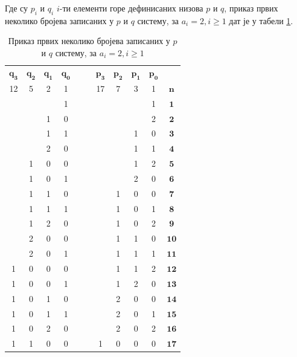 \documentclass[a4paper]{article}
\begin{document}
Где су $ p_{i} $ и $ q_{i} $ $ i $-ти елементи горе дефинисаних низова $ p $ и $ q $, приказ првих неколико бројева записаних у $ p $ и $ q $ систему, за $ a_{i} = 2 , i \ge 1 $ дат је у табели \ref{tab:p_q_sistem}.

\begin{table}[h!]
	\caption{Приказ првих неколико бројева записаних у $ p $ и $ q $ систему, за $ a_{i} = 2 , i \ge 1 $}
	\label{tab:p_q_sistem}
	\begin{center}
		\begin{tabular}{ | c | c | c | c | c  c | c | c | c | c | c |}
			\hline
			{$ \mathbf{q_{3}} $} &  {$ \mathbf{q_{2}} $} &  {$ \mathbf{q_{1}} $} &  {$ \mathbf{q_{0}} $} & & &  {$ \mathbf{p_{3}} $} &  {$ \mathbf{p_{2}} $} &  {$ \mathbf{p_{1}} $} &  {$ \mathbf{p_{0}} $} &\\
			12 & 5 & 2 & 1 & & & 17 & 7 & 3 & 1 &  {$ \mathbf{n} $}\\
			\hline
			&  &  & 1 & & &  &  &  & 1 & {$ \mathbf{1} $}\\
			&  & 1 & 0 & & &  &  &  & 2 & {$ \mathbf{2} $}\\
			&  & 1 & 1 & & &  &  & 1 & 0 &  {$ \mathbf{3} $}\\
			&  & 2 & 0 & & &  &  & 1 & 1 &  {$ \mathbf{4} $}\\
			& 1 & 0 & 0 & & &  &  & 1 & 2 &  {$ \mathbf{5} $}\\
			& 1 & 0 & 1 & & &  &  & 2 & 0 &  {$ \mathbf{6} $}\\
			& 1 & 1 & 0 & & &  & 1 & 0 & 0 &  {$ \mathbf{7} $}\\
			& 1 & 1 & 1 & & &  & 1 & 0 & 1 &  {$ \mathbf{8} $}\\
			& 1 & 2 & 0 & & &  & 1 & 0 & 2 &  {$ \mathbf{9} $}\\
			& 2 & 0 & 0 & & &  & 1 & 1 & 0 &  {$ \mathbf{10} $}\\
			& 2 & 0 & 1 & & &  & 1 & 1 & 1 &  {$ \mathbf{11} $}\\
			 1 & 0 & 0 & 0 & & & & 1 & 1 & 2 &  {$ \mathbf{12} $}\\
			 1 & 0 & 0 & 1 & & & & 1 & 2 & 0 &  {$ \mathbf{13} $}\\
			 1 & 0 & 1 & 0 & & & & 2 & 0 & 0 &  {$ \mathbf{14} $}\\
			 1 & 0 & 1 & 1 & & & & 2 & 0 & 1 &  {$ \mathbf{15} $}\\
			 1 & 0 & 2 & 0 & & & & 2 & 0 & 2 &  {$ \mathbf{16} $}\\
			 1 & 1 & 0 & 0 & & & 1 & 0 & 0 & 0 &  {$ \mathbf{17} $}\\
			\hline 
		\end{tabular}
	\end{center}
\end{table}
\end{document}
